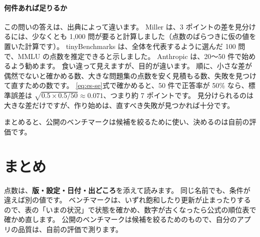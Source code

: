 \paragraph{何件あれば足りるか}
この問いの答えは、出典によって違います。
Miller \cite{miller2024errorbars} は、3 ポイントの差を見分けるには、少なくとも 1,000 問が要ると計算しました（点数のばらつきに仮の値を置いた計算です）。
tinyBenchmarks \cite{polo2024tinybenchmarks} は、全体を代表するように選んだ 100 問で、MMLU の点数を推定できると示しました。
Anthropic は、20〜50 件で始めるよう勧めます。
食い違って見えますが、目的が違います。
順に、小さな差が偶然でないと確かめる数、大きな問題集の点数を安く見積もる数、失敗を見つけて直すための数です。
\eqref{eq:es-se}式で確かめると、50 件で正答率が 50\% なら、標準誤差は $\sqrt{0.5\times0.5/50}\approx0.071$、つまり約 7 ポイントです。
見分けられるのは大きな差だけですが、作り始めは、直すべき失敗が見つかれば十分です。

まとめると、公開のベンチマークは候補を絞るために使い、決めるのは自前の評価です。

\section{まとめ}\label{sec:bm-summary}

点数は、\textbf{版・設定・日付・出どころ}を添えて読みます。
同じ名前でも、条件が違えば別の値です。
ベンチマークは、いずれ飽和したり更新が止まったりするので、表の「いまの状況」で状態を確かめ、数字が古くなったら公式の順位表で確かめ直します。
公開のベンチマークは候補を絞るためのもので、自分のアプリの品質は、自前の評価で測ります。

